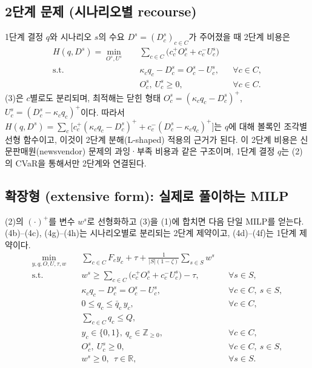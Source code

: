 \documentclass[10pt,a4paper]{article}
\begin{document}
\subsection{2단계 문제 (시나리오별 recourse)}

1단계 결정 $q$와 시나리오 $s$의 수요 $D^s=(D_c^s)_{c\in C}$가 주어졌을 때 2단계 비용은
\begin{subequations}\label{eq:second}
\begin{align}
H(q,D^s)=\min_{O^s,U^s}\quad
 & \sum_{c\in C}\big(c_c^+O_c^s+c_c^-U_c^s\big) \label{eq:3a}\\
\text{s.t.}\quad
 & \kappa_c q_c-D_c^s=O_c^s-U_c^s, && \forall c\in C, \label{eq:3b}\\
 & O_c^s,\ U_c^s\ge 0, && \forall c\in C. \label{eq:3c}
\end{align}
\end{subequations}
(3)은 $c$별로도 분리되며, 최적해는 닫힌 형태 $O_c^s=(\kappa_c q_c-D_c^s)^+$, $U_c^s=(D_c^s-\kappa_c q_c)^+$이다. 따라서 $H(q,D^s)=\sum_c\big[c_c^+(\kappa_c q_c-D_c^s)^+ + c_c^-(D_c^s-\kappa_c q_c)^+\big]$는 $q$에 대해 볼록인 조각별 선형 함수이고, 이것이 2단계 분해(L-shaped) 적용의 근거가 된다.
이 2단계 비용은 신문판매원(newsvendor) 문제의 과잉·부족 비용과 같은 구조이며, 1단계 결정 $q$는 (2)의 CVaR을 통해서만 2단계와 연결된다.

\subsection{확장형 (extensive form): 실제로 풀이하는 MILP}

(2)의 $(\cdot)^+$를 변수 $w^s$로 선형화하고 (3)을 (1)에 합치면 다음 단일 MILP를 얻는다. (4b)--(4c), (4g)--(4h)는 시나리오별로 분리되는 2단계 제약이고, (4d)--(4f)는 1단계 제약이다.
\begin{subequations}\label{eq:ext}
\begin{align}
\min_{y,q,O,U,\tau,w}\quad
 & \sum_{c\in C}F_c y_c+\tau+\frac{1}{|S|(1-\zeta)}\sum_{s\in S}w^s \label{eq:4a}\\
\text{s.t.}\quad
 & w^s\ge\sum_{c\in C}\big(c_c^+O_c^s+c_c^-U_c^s\big)-\tau, && \forall s\in S, \label{eq:4b}\\
 & \kappa_c q_c-D_c^s=O_c^s-U_c^s, && \forall c\in C,\ s\in S, \label{eq:4c}\\
 & 0\le q_c\le\bar q_c\,y_c, && \forall c\in C, \label{eq:4d}\\
 & \sum_{c\in C}q_c\le Q, \label{eq:4e}\\
 & y_c\in\{0,1\},\ q_c\in\mathbb Z_{\ge0}, && \forall c\in C, \label{eq:4f}\\
 & O_c^s,\ U_c^s\ge 0, && \forall c\in C,\ s\in S, \label{eq:4g}\\
 & w^s\ge 0,\ \ \tau\in\mathbb R, && \forall s\in S. \label{eq:4h}
\end{align}
\end{subequations}
\end{document}
